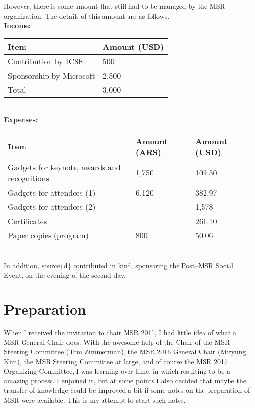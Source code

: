 \documentclass[a4paper]{report}
\begin{document}
However, there is some amount that still had to be managed by the MSR organization. The details of this amount are as follows. \\

\textbf{Income:} \\

\begin{tabular}{|l|l|}
  \hline \hline
  Item & Amount (USD) \\ \hline \hline
  Contribution by ICSE & 500 \\ \hline
  Sponsorship by Microsoft & 2,500 \\ \hline \hline
  Total & 3,000 \\ \hline
\end{tabular}
\\

\textbf{Expenses:}
\\

\begin{tabular}{|l|l|l|}
  \hline \hline
  Item & Amount (ARS) & Amount (USD) \\ \hline
  Gadgets for keynote, awards and recognitions & 1,750 & 109.50 \\ \hline
  Gadgets for attendees (1) & 6.120 & 382.97 \\ \hline
  Gadgets for attendees (2) &       & 1,578 \\ \hline
  Certificates &    &  261.10 \\ \hline
  Paper copies (program) & 800 & 50.06 \\ \hline
  
\end{tabular}
\\

In addition, source\{d\} contributed in kind, sponsoring the Post--MSR Social Event, on the evening of the second day. \\


\chapter{Preparation}

When I received the invitation to chair MSR 2017, I had little idea of what a MSR General Chair does. With the awesome help of the Chair of the MSR Steering Committee (Tom Zimmerman), the MSR 2016 General Chair (Miryung Kim), the MSR Steering Committee at large, and of course the MSR 2017 Organizing Committee, I was learning over time, in which resulting to be a amazing process. I enjoined it, but at some points I also decided that maybe the transfer of knowledge could be improved a bit if some notes on the preparation of MSR were available. This is my attempt to start such notes.
\end{document}
